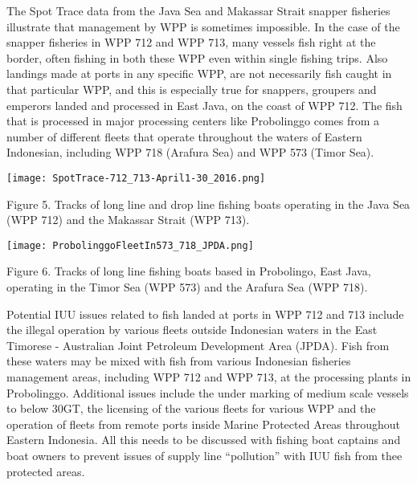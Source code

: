The Spot Trace data from the Java Sea and Makassar Strait snapper fisheries illustrate that management by WPP is sometimes impossible. In the case of the snapper fisheries in WPP 712 and WPP 713, many vessels fish right at the border, often fishing in both these WPP even within single fishing trips. Also landings made at ports in any specific WPP, are not necessarily fish caught in that particular WPP, and this is especially true for snappers, groupers and emperors landed and processed in East Java, on the coast of WPP 712. The fish that is processed in major processing centers like Probolinggo comes from a number of different fleets that operate throughout the waters of Eastern Indonesian, including WPP 718 (Arafura Sea) and WPP 573 (Timor Sea).

\begin{center}
\graphicspath{{/root/R-project/IFishSnapperWPP712_713/Images/}}
\texttt{[image: SpotTrace-712\_713-April1-30\_2016.png]}

Figure 5. Tracks of long line and drop line fishing boats operating in the Java Sea (WPP 712) and the Makassar Strait (WPP 713).
\end{center}

\begin{center}
\graphicspath{{/root/R-project/IFishSnapperWPP712_713/Images/}}
\texttt{[image: ProbolinggoFleetIn573\_718\_JPDA.png]}

Figure 6. Tracks of long line fishing boats based in Probolingo, East Java, operating in the Timor Sea (WPP 573) and the Arafura Sea (WPP 718).
\end{center}


Potential IUU issues related to fish landed at ports in WPP 712 and 713 include the illegal operation by various fleets outside Indonesian waters in the East Timorese - Australian Joint Petroleum Development Area (JPDA). Fish from these waters may be mixed with fish from various Indonesian fisheries management areas, including WPP 712 and WPP 713, at the processing plants in Probolinggo. Additional issues include the under marking of medium scale vessels to below 30GT, the licensing of the various fleets for various WPP and the operation of fleets from remote ports inside Marine Protected Areas throughout Eastern Indonesia. All this needs to be discussed with fishing boat captains and boat owners to prevent issues of supply line ``pollution'' with IUU fish from thee protected areas.
